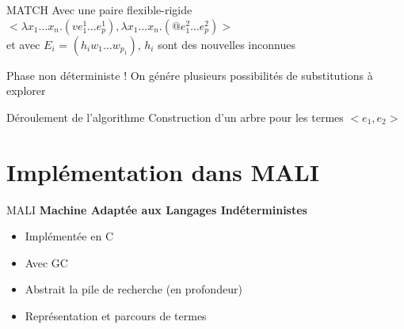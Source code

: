 \documentclass[aspectratio=169]{beamer}
\begin{document}
\begin{frame}{MATCH}
  Avec une paire flexible-rigide $<\lambda x_1 \ldots x_n . (v e_1^1 \ldots e_p^1), \lambda x_1 \ldots x_n . (@ e_1^2 \ldots e_p^2)>$\\
 et avec $E_i$ = $(h_i w_1 \ldots w_{p_1})$, $h_i$ sont des nouvelles inconnues
  \begin{algorithmic}
    \EndIf
    \EndFor
    \EndProcedure
  \end{algorithmic}

  Phase non déterministe ! On génére plusieurs possibilités de substitutions à explorer
\end{frame}

\begin{frame}{Déroulement de l'algorithme}
  Construction d'un arbre pour les termes $<e_1, e_2>$
  \begin{algorithmic}
    \EndWhile
    \EndProcedure
  \end{algorithmic}
\end{frame}

\section{Implémentation dans MALI}

\begin{frame}{MALI}
  \textbf{Machine Adaptée aux Langages Indéterministes}
  \begin{itemize}
    \item Implémentée en C
    \item Avec GC
    \item Abstrait la pile de recherche (en profondeur)
    \item Représentation et parcours de termes
  \end{itemize}
\end{frame}
\end{document}
